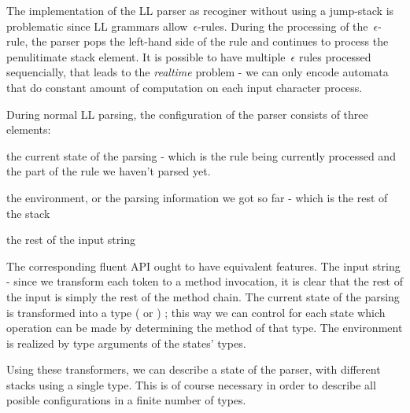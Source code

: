 The implementation of the LL parser as recoginer without using
  a jump-stack is problematic since LL grammars allow~$\epsilon$-rules.
During the processing of the~$\epsilon$-rule, the parser pops the 
  left-hand side of the rule and continues to process the penulitimate
  stack element.
It is possible to have multiple~$\epsilon$ rules processed sequencially,
  that leads to the \textit{realtime} problem - we can only encode
  automata that do constant amount of computation on each input character
  process.

During normal LL parsing, the configuration of the parser consists
  of three elements:
\begin{Itemize}
  \item the current state of the parsing - which is the
    rule being currently processed and the part of the rule we
    haven't parsed yet.
  \item the environment, or the parsing information we got so far -
    which is the rest of the stack
  \item the rest of the input string
\end{Itemize}


The corresponding \Java fluent API ought to have equivalent features.
The input string - since we transform each
  token to a method invocation, it is clear that the rest of the input is
  simply the rest of the method chain.
The current state of the parsing is transformed into a \Java type
  ( or ) ; this way we can control for each state
  which operation can be made by determining the method of that type.
The environment is realized by type arguments of the states' \Java types.

Using these transformers, we can describe a state of the parser,
  with different stacks using a single type.
This is of course necessary in order to describe all posible configurations
  in a finite number of \Java types.

